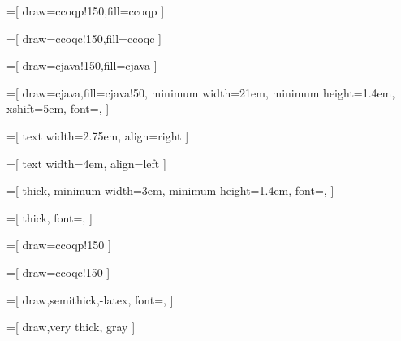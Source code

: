 

=[
 draw=ccoqp!150,fill=ccoqp
]

=[
 draw=ccoqc!150,fill=ccoqc
]

=[
 draw=cjava!150,fill=cjava
]

=[
 draw=cjava,fill=cjava!50,
 minimum width=21em,
 minimum height=1.4em,
 xshift=5em,
 font=\scriptsize\sffamily,
]

=[
 text width=2.75em,
 align=right
]

=[
 text width=4em,
 align=left
]

=[
 thick,
 minimum width=3em,
 minimum height=1.4em,
 font=\scriptsize\sffamily,
]

=[
 thick,
 font=\scriptsize\sffamily,
]

=[
 draw=ccoqp!150
]

=[
 draw=ccoqc!150
]

=[
 draw,semithick,-latex,
 font=\scriptsize\sffamily,
]

=[
 draw,very thick, gray
]

\newcommand{\tikzoptim}[3][]{
   \path[trans, draw=#1!150, fill=#1!150] (#2) edge [looseness=10, loop above, draw=#1!150]
       node [pos=0.5](#2-optim) {}
       node [yshift = 0.5em,below] {\href{#3}{\phantom{XXX}} \\ \href{#3}{\phantom{XXX}}} ();
}
\newcommand{\tikzoptimdashed}[3][]{
   \path[trans, draw=#1!150, fill=#1!150] (#2) edge [looseness=10, loop above, dashed, draw=#1!150]
       node [pos=0.5](#2-optim) {}
       node [yshift = 0.5em,below] {\href{#3}{\phantom{XXX}} \\ \href{#3}{\phantom{XXX}}} ();
}

\newcommand{\transref}[2]{
   \foreach \i in {0,...,#1} { node [pos=\i/#1, circle] {\href{#2}{\phantom{X}}}}
}

\newcommand{\transocamljava}[1]{
 \path[draw,thick,latex-latex, densely dashed,
      shorten >=0.2em, shorten <=0.2em,
       java] ([xshift=-0.75em] #1.south) -- ([xshift=-0.75em] #1-java.north);
}

